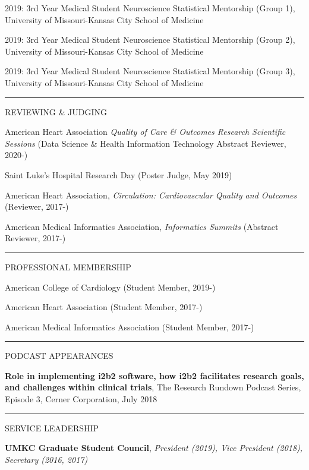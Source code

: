 \documentclass[
]{article}
\begin{document}
2019: 3rd Year Medical Student Neuroscience Statistical Mentorship
(Group 1), University of Missouri-Kansas City School of Medicine

2019: 3rd Year Medical Student Neuroscience Statistical Mentorship
(Group 2), University of Missouri-Kansas City School of Medicine

2019: 3rd Year Medical Student Neuroscience Statistical Mentorship
(Group 3), University of Missouri-Kansas City School of Medicine

\begin{center}\rule{0.5\linewidth}{0.5pt}\end{center}

REVIEWING \& JUDGING

American Heart Association \emph{Quality of Care \& Outcomes Research
Scientific Sessions} (Data Science \& Health Information Technology
Abstract Reviewer, 2020-)

Saint Luke's Hospital Research Day (Poster Judge, May 2019)

American Heart Association, \emph{Circulation: Cardiovascular Quality
and Outcomes} (Reviewer, 2017-)

American Medical Informatics Association, \emph{Informatics Summits}
(Abstract Reviewer, 2017-)

\begin{center}\rule{0.5\linewidth}{0.5pt}\end{center}

PROFESSIONAL MEMBERSHIP

American College of Cardiology (Student Member, 2019-)

American Heart Association (Student Member, 2017-)

American Medical Informatics Association (Student Member, 2017-)

\begin{center}\rule{0.5\linewidth}{0.5pt}\end{center}

PODCAST APPEARANCES

\textbf{Role in implementing i2b2 software, how i2b2 facilitates
research goals, and challenges within clinical trials}, The Research
Rundown Podcast Series, Episode 3, Cerner Corporation, July 2018

\begin{center}\rule{0.5\linewidth}{0.5pt}\end{center}

SERVICE LEADERSHIP

\textbf{UMKC Graduate Student Council}, \emph{President (2019), Vice
President (2018), Secretary (2016, 2017)}
\end{document}
